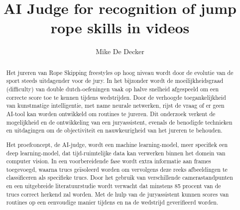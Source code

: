 \documentclass[english]{hogent-article}
\title{AI Judge for recognition of jump rope skills in videos}
\author{Mike De Decker}
\begin{document}
\begin{abstract}
Het jureren van Rope Skipping freestyles op hoog niveau wordt door de evolutie van de sport steeds uitdagender voor de jury. In het bijzonder wordt de moeilijkheidsgraad (difficulty) van double dutch-oefeningen vaak op halve snelheid afgespeeld om een correcte score toe te kennen tijdens wedstrijden. Door de verhoogde toegankelijkheid van kunstmatige intelligentie, met name neurale netwerken, rijst de vraag of er geen AI-tool kan worden ontwikkeld om routines te jureren. Dit onderzoek verkent de mogelijkheid en de ontwikkeling van een juryassistent, evenals de benodigde technieken en uitdagingen om de objectiviteit en nauwkeurigheid van het jureren te behouden.

Het proefconcept, de AI-judge, wordt een machine learning-model, meer specifiek een deep learning-model, dat tijd-ruimtelijke data kan verwerken binnen het domein van computer vision. In een voorbereidende fase wordt extra informatie aan frames toegevoegd, waarna trucs geïsoleerd worden om vervolgens deze reeks afbeeldingen te classificeren als specifieke trucs. Door het gebruik van verschillende camerastandpunten en een uitgebreide literatuurstudie wordt verwacht dat minstens 85 procent van de trucs correct herkend zal worden. Met de hulp van de juryassistent kunnen scores van routines op een eenvoudige manier tijdens en na de wedstrijd geverifieerd worden.
\end{abstract}

\tableofcontents



\printbibliography[heading=bibintoc]
\end{document}
